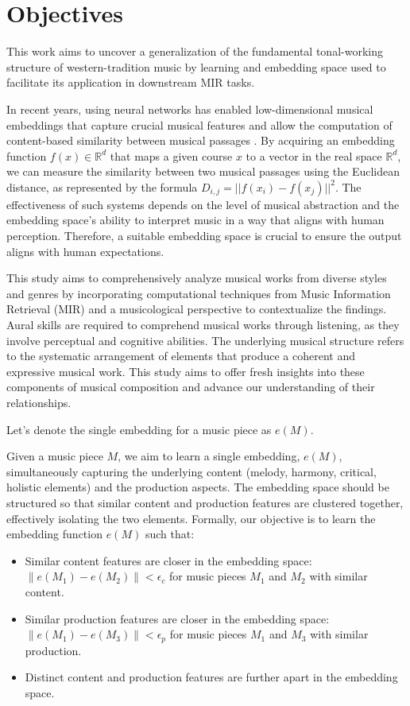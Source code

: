 \section{Objectives}

This work aims to uncover a generalization of the fundamental tonal-working structure of western-tradition music by learning and embedding space used to facilitate its application in downstream MIR tasks.

In recent years, using neural networks has enabled low-dimensional musical embeddings that capture crucial musical features and allow the computation of content-based similarity between musical passages \cite{}. By acquiring an embedding function $f(x) \in \mathbb{R}^d$ that maps a given course $x$ to a vector in the real space $\mathbb{R}^d$, we can measure the similarity between two musical passages using the Euclidean distance, as represented by the formula $D_{i,j} = ||f(x_i) - f(x_j)||^2$. The effectiveness of such systems depends on the level of musical abstraction and the embedding space's ability to interpret music in a way that aligns with human perception. Therefore, a suitable embedding space is crucial to ensure the output aligns with human expectations.

This study aims to comprehensively analyze musical works from diverse styles and genres by incorporating computational techniques from Music Information Retrieval (MIR) and a musicological perspective to contextualize the findings. Aural skills are required to comprehend musical works through listening, as they involve perceptual and cognitive abilities. The underlying musical structure refers to the systematic arrangement of elements that produce a coherent and expressive musical work. This study aims to offer fresh insights into these components of musical composition and advance our understanding of their relationships.

Let's denote the single embedding for a music piece as $e(M)$.

Given a music piece $M$, we aim to learn a single embedding, $e(M)$, simultaneously capturing the underlying content (melody, harmony, critical, holistic elements) and the production aspects. The embedding space should be structured so that similar content and production features are clustered together, effectively isolating the two elements. Formally, our objective is to learn the embedding function $e(M)$ such that:

\begin{itemize}
  \item Similar content features are closer in the embedding space: $\|e(M_1) - e(M_2)\| < \epsilon_c$ for music pieces $M_1$ and $M_2$ with similar content.
  \item Similar production features are closer in the embedding space: $\|e(M_1) - e(M_3)\| < \epsilon_p$ for music pieces $M_1$ and $M_3$ with similar production.
  \item Distinct content and production features are further apart in the embedding space.
\end{itemize}


